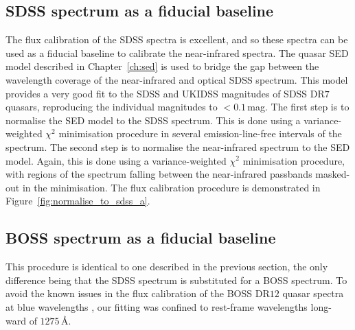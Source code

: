 \subsection{SDSS spectrum as a fiducial baseline}

The flux calibration of the SDSS spectra is excellent, and so these spectra can be used as a fiducial baseline to calibrate the near-infrared spectra. 
The quasar SED model described in Chapter~\ref{ch:sed} is used to bridge the gap between the wavelength coverage of the near-infrared and optical SDSS spectrum.
This model provides a very good fit to the SDSS and UKIDSS magnitudes of SDSS DR$7$ quasars, reproducing the individual magnitudes to $<0.1$\,mag.
The first step is to normalise the SED model to the SDSS spectrum. 
This is done using a variance-weighted $\chi^2$ minimisation procedure in several emission-line-free intervals of the spectrum.   
The second step is to normalise the near-infrared spectrum to the SED model. 
Again, this is done using a variance-weighted $\chi^2$ minimisation procedure, with regions of the spectrum falling between the near-infrared passbands masked-out in the minimisation. 
The flux calibration procedure is demonstrated in Figure~\ref{fig:normalise_to_sdss_a}. 

\subsection{BOSS spectrum as a fiducial baseline}

This procedure is identical to one described in the previous section, the only difference being that the SDSS spectrum is substituted for a BOSS spectrum. 
To avoid the known issues in the flux calibration of the BOSS DR$12$ quasar spectra at blue wavelengths \citep{lee13}, our fitting was confined to rest-frame wavelengths long-ward of $1275$\,\AA.


